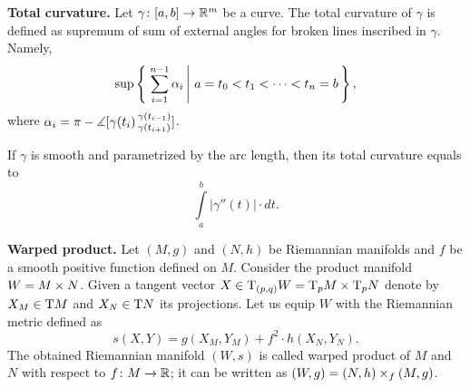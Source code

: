 \begin{description}
\item{\bf Total curvature.}
\label{Total curvature} 
Let $\gamma\colon[a,b]\to\mathbb{R}^m$ be a curve.
The total curvature of $\gamma$ is defined as supremum of sum of external angles for broken lines inscribed in $\gamma$. 
Namely, 
\[\sup\set{\sum_{i=1}^{n-1}\alpha_i}{a=t_0<t_1<\dots<t_n=b},\]
where $\alpha_i=\pi-\measuredangle [\gamma(t_{i})\,{}^{\gamma(t_{i-1})}_{\gamma(t_{i+1})}]$.

If $\gamma$ is smooth and parametrized by the arc length, 
then its total curvature equals to
\[\int\limits_a^b|\gamma''(t)|\cdot dt.\]

\item{\bf Warped product.}
\label{def:Warped product} 
Let $(M,g)$ and $(N,h)$ be Riemannian manifolds 
and $f$ be a smooth positive function defined on $M$.
Consider the product manifold $W\z=M\times N$.
Given a tangent vector 
$X\z\in \T_{(p,q)} W
\z=\T_p M\times \T_p N$ denote by 
$X_M\z\in \T M$ and $X_N\z\in \T N$ its projections.
Let us equip $W$ with the Riemannian metric defined as
\[s(X,Y)=g(X_M,Y_M)+f^2\cdot h(X_N,Y_N).\]
The obtained Riemannian manifold $(W,s)$ is called warped product of $M$ and $N$ with respect to $f\colon M\to \mathbb{R}$;
it can be written as  $(W,g)\z=(N,h)\times_f(M,g)$.

\end{description}
